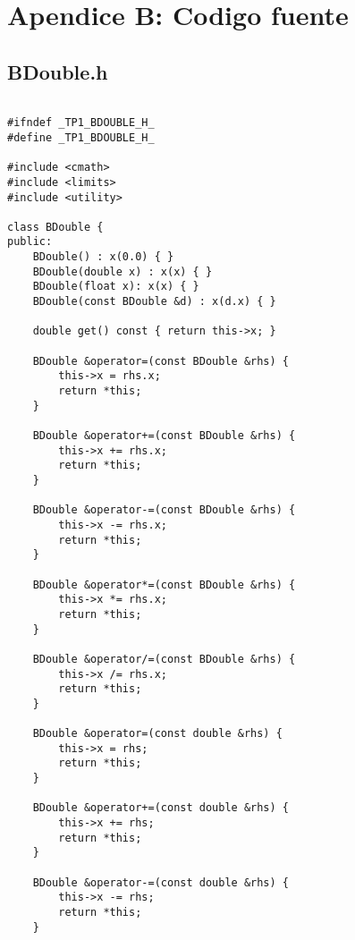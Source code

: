 \section{Apendice B: Codigo fuente}

\subsection{BDouble.h}

\begin{codesnippet}
\begin{verbatim}

#ifndef _TP1_BDOUBLE_H_
#define _TP1_BDOUBLE_H_

#include <cmath>
#include <limits>
#include <utility>

class BDouble {
public:
    BDouble() : x(0.0) { }
    BDouble(double x) : x(x) { }
    BDouble(float x): x(x) { }
    BDouble(const BDouble &d) : x(d.x) { }

    double get() const { return this->x; }

    BDouble &operator=(const BDouble &rhs) {
        this->x = rhs.x;
        return *this;
    }

    BDouble &operator+=(const BDouble &rhs) {
        this->x += rhs.x;
        return *this;
    }

    BDouble &operator-=(const BDouble &rhs) {
        this->x -= rhs.x;
        return *this;
    }

    BDouble &operator*=(const BDouble &rhs) {
        this->x *= rhs.x;
        return *this;
    }

    BDouble &operator/=(const BDouble &rhs) {
        this->x /= rhs.x;
        return *this;
    }

    BDouble &operator=(const double &rhs) {
        this->x = rhs;
        return *this;
    }

    BDouble &operator+=(const double &rhs) {
        this->x += rhs;
        return *this;
    }

    BDouble &operator-=(const double &rhs) {
        this->x -= rhs;
        return *this;
    }
    
\end{verbatim}
\end{codesnippet}

